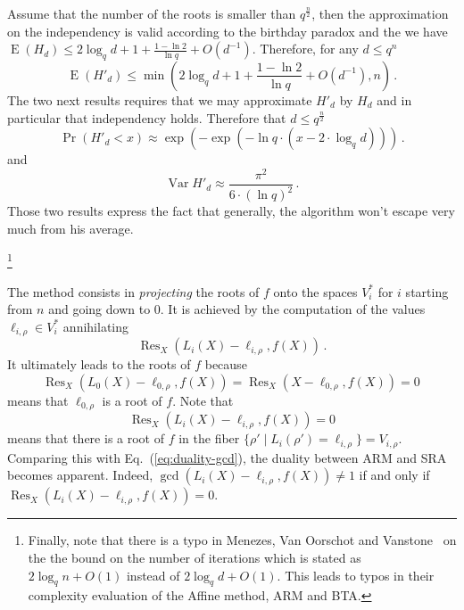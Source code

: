 \documentclass{sig-alternate}
\newcommand{\dd}{d}
\newcommand{\qq}{q}
\newcommand{\nn}{n}
\DeclareMathOperator{\Var}{Var}
\DeclareMathOperator{\Exp}{E}
\newcommand{\bigO}{O}
\DeclareMathOperator{\Res}{Res}
\newcounter{algo}
\renewcommand{\paragraph}[1]{\smallskip\noindent{{\bf \rm #1.}}}
\begin{document}
 Assume that  the number of the roots is smaller than $\qq^{\frac{\nn}{2}}$, then the approximation on the independency is valid according to the birthday paradox and the we have $\Exp(H_\dd) \le 2 \log_\qq \dd +1 +\frac{1-\ln 2}{\ln \qq} + \bigO(\dd^{-1})$. Therefore, for any $\dd \le \qq^\nn$
$$\Exp(H' _\dd) \le  \min(2 \log_\qq \dd +1 +\frac{1-\ln 2}{\ln \qq} + \bigO(\dd^{-1}), \nn)\,.$$
The two next results requires that we may approximate $H'_\dd$ by $H_\dd$ and in particular that independency holds. Therefore that $\dd \le \qq^{\frac{\nn}{2}}$
$$\Pr(H'_\dd <x) \approx \exp(-\exp(-\ln \qq \cdot (x-2 \cdot \log_\qq \dd)))\,.$$
and 
$$\Var H'_\dd \approx \frac{\pi^2}{6 \cdot (\ln \qq)^2}\,.$$
Those two results express the fact that generally, the algorithm won't escape very much from his average.
 


\footnote{Finally, note that there is a typo in Menezes, Van Oorschot and Vanstone~\cite{Menvanovans92} on the the bound on the number of iterations which is stated as $ 2\log_q \nn + \bigO(1)$  instead of $2\log_q \dd + \bigO(1)$. This leads to typos in their complexity evaluation of the Affine method, ARM and BTA.}





\paragraph{SRA} The method consists in \emph{projecting} the roots of $f$ onto the spaces $V_i^\ast$ for $i$ starting from $n$ and going down to 0.
It is achieved by the computation of the values $\ell_{i,\rho} \in V_i^\ast$ annihilating
 \begin{equation}
 \label{base_SRA}
\Res_X(L_i(X)-\ell_{i,\rho},f(X)) \,.
\end{equation}
It ultimately leads to the roots of $f$ because
$$\Res_X(L_0(X)-\ell_{0,\rho},f(X))=\Res_X(X-\ell_{0,\rho},f(X))=0\,$$
means that $\ell_{0,\rho}$ is a root of $f$. Note that 
\begin{equation}
  \label{eq:duality-res}
  \Res_X(L_i(X)-\ell_{i,\rho},f(X)) =0
\end{equation}
means that there is a root of $f$ in the fiber $\{\rho' \mid
L_i(\rho')=\ell_{i,\rho} \}=V_{i,\rho}$.  Comparing this with
Eq.~(\ref{eq:duality-gcd}), the duality between ARM and SRA becomes
apparent. Indeed, $\gcd(L_i(X)-\ell_{i,\rho},f(X)) \ne 1$ if and only
if $\Res_X(L_i(X)-\ell_{i,\rho},f(X)) =0$.
\end{document}
